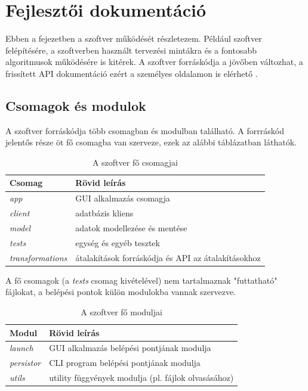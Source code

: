 \chapter{Fejlesztői dokumentáció}
\label{ch:impl}

Ebben a fejezetben a szoftver működését részletezem.
Például szoftver felépítésére, a szoftverben használt tervezési mintákra és
a fontosabb algoritmusok működésére is kitérek.
A szoftver forráskódja a jövőben változhat,
a frissített API dokumentáció ezért a személyes oldalamon is elérhető \cite{apidoc}.

\section{Csomagok és modulok}

A szoftver forráskódja több csomagban és modulban található.
A forrráskód jelentős része öt fő csomagba van szerveze,
ezek az alábbi táblázatban láthatók.

\begin{table}[H]
	\centering
	\begin{tabular}{ | m{} | m{} | }
		\hline
		\textbf{Csomag} & \textbf{Rövid leírás} \\
		\hline \hline
		\emph{app} & GUI alkalmazás csomagja \\
		\hline
		\emph{client} & adatbázis kliens \\
		\hline
		\emph{model} & adatok modellezése és mentése \\
		\hline
		\emph{tests} & egység és egyéb tesztek \\
		\hline
		\emph{transformations} & átalakítások forráskódja és API az átalakításokhoz \\
		\hline
	\end{tabular}
	\caption{A szoftver fő csomagjai}
	\label{tab:packages}
\end{table}

A fő csomagok (a \emph{tests} csomag kivételével) nem tartalmaznak "futtatható" fájlokat,
a belépési pontok külön modulokba vannak szervezve.

\begin{table}[H]
	\centering
	\begin{tabular}{ | m{} | m{} | }
		\hline
		\textbf{Modul} & \textbf{Rövid leírás} \\
		\hline \hline
		\emph{launch} & GUI alkalmazás belépési pontjának modulja \\
		\hline
		\emph{persistor} & CLI program belépési pontjának modulja \\
		\hline
		\emph{utils} & utility függvények modulja (pl. fájlok olvasásához)  \\
		\hline
	\end{tabular}
	\caption{A szoftver fő moduljai}
	\label{tab:modules}
\end{table}

